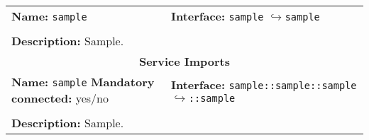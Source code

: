 \begin{center}
\begin{tabular}{|p{7.5cm}|p{7.5cm}|}
		\hline
		\multicolumn{1}{|p{7.5cm}}{\textbf{Name:} \texttt{sample}} & \multicolumn{1}{p{7.5cm}|}{\textbf{Interface:} \newline \texttt{sample} \newline$\hookrightarrow$\texttt{sample}}\\
		\multicolumn{2}{|l|}{}\\
		\multicolumn{2}{|p{15cm}|}{\textbf{Description:} \newline Sample.}\\
		\hline
		\hline
		\multicolumn{2}{|c|}{\textbf{\large Service Imports}}\\
		\hline
		\multicolumn{1}{|p{7.5cm}}{\textbf{Name:} \texttt{sample} \newline \textbf{Mandatory connected:} yes/no} & \multicolumn{1}{p{7.5cm}|}{\textbf{Interface:} \newline \texttt{sample::sample::sample} \newline$\hookrightarrow$\texttt{::sample}}\\
		\multicolumn{2}{|l|}{}\\
		\multicolumn{2}{|p{15cm}|}{\textbf{Description:} \newline Sample.}\\
		\hline
	\end{tabular}
\end{center}

